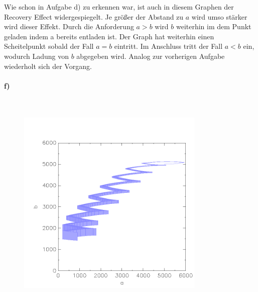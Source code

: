 Wie schon in Aufgabe d) zu erkennen war, ist auch in diesem Graphen der Recovery Effect widergespiegelt. Je größer der Abstand zu $a$ wird umso stärker wird dieser Effekt. Durch die Anforderung $a>b$ wird $b$ weiterhin im dem Punkt geladen indem a bereits entladen ist. Der Graph hat weiterhin einen Scheitelpunkt sobald der Fall $a=b$ eintritt. Im Anschluss tritt der Fall $a<b$ ein, wodurch Ladung von $b$ abgegeben wird. Analog zur vorherigen Aufgabe wiederholt sich der Vorgang. 

\paragraph{f)}\mbox{} \\

\begin{figure}[H]
	\centering
	\includegraphics[width=0.8\textwidth]{Aufgabe_f).png}
\end{figure}


